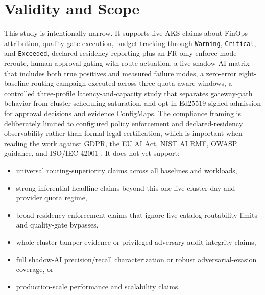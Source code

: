 \section{Validity and Scope}
\label{sec:validity}
This study is intentionally narrow. It supports live AKS claims about FinOps attribution, quality-gate execution, budget tracking through \texttt{Warning}, \texttt{Critical}, and \texttt{Exceeded}, declared-residency reporting plus an FR-only enforce-mode reroute, human approval gating with route actuation, a live shadow-AI matrix that includes both true positives and measured failure modes, a zero-error eight-baseline routing campaign executed across three quota-aware windows, a controlled three-profile latency-and-capacity study that separates gateway-path behavior from cluster scheduling saturation, and opt-in Ed25519-signed admission for approval decisions and evidence ConfigMaps. The compliance framing is deliberately limited to configured policy enforcement and declared-residency observability rather than formal legal certification, which is important when reading the work against GDPR, the EU AI Act, NIST AI RMF, OWASP guidance, and ISO/IEC 42001 \cite{gdprInfo,euAIActSummary,nistAIRMF,owaspLLMTop10,iso42001}. It does not yet support:
\begin{itemize}[leftmargin=*]
\item universal routing-superiority claims across all baselines and workloads,
\item strong inferential headline claims beyond this one live cluster-day and provider quota regime,
\item broad residency-enforcement claims that ignore live catalog routability limits and quality-gate bypasses,
\item whole-cluster tamper-evidence or privileged-adversary audit-integrity claims,
\item full shadow-AI precision/recall characterization or robust adversarial-evasion coverage, or
\item production-scale performance and scalability claims.
\end{itemize}

